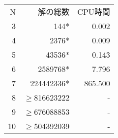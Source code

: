 \begin{tabular}{r|r|r}
 \hline
 N& 解の総数& CPU時間\\
 3&144*&0.002\\
 4&2376*&0.009\\
 5&43536*&0.143\\
 6&2589768*&7.796\\
 7&224442336*&865.500\\
 8&$\geq$816623222&-\\
 9&$\geq$676088853&-\\
 10&$\geq$504392039&-\\
\end{tabular}
